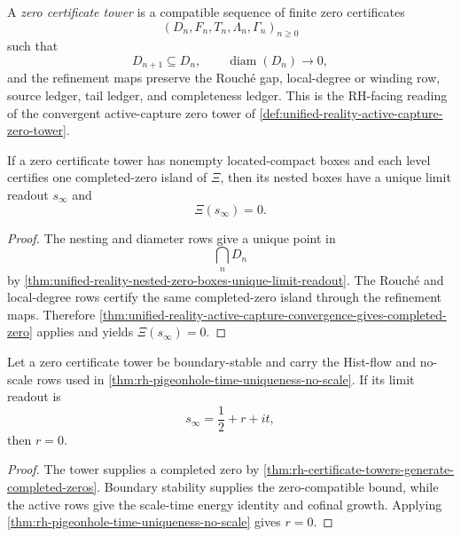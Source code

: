 \begin{definition}
\label{def:rh-zero-certificate-tower}
A \emph{zero certificate tower} is a compatible sequence of finite zero
certificates
$$
(D_n,F_n,T_n,\Lambda_n,\Gamma_n)_{n\ge0}
$$
such that
$$
D_{n+1}\subseteq D_n,
\qquad
\operatorname{diam}(D_n)\to0,
$$
and the refinement maps preserve the Rouch\'e gap, local-degree or
winding row, source ledger, tail ledger, and completeness ledger. This is
the RH-facing reading of the convergent active-capture zero tower of
\autoref{def:unified-reality-active-capture-zero-tower}.
\end{definition}

\begin{theorem}
\label{thm:rh-certificate-towers-generate-completed-zeros}
If a zero certificate tower has nonempty located-compact boxes and each
level certifies one completed-zero island of $\Xi$, then its nested boxes
have a unique limit readout $s_{\infty}$ and
$$
\Xi(s_{\infty})=0.
$$
\end{theorem}

\begin{proof}
The nesting and diameter rows give a unique point in
$$
\bigcap_nD_n
$$
by \autoref{thm:unified-reality-nested-zero-boxes-unique-limit-readout}.
The Rouch\'e and local-degree rows certify the same completed-zero island
through the refinement maps. Therefore
\autoref{thm:unified-reality-active-capture-convergence-gives-completed-zero}
applies and yields $\Xi(s_{\infty})=0$.
\end{proof}

\begin{corollary}
\label{cor:rh-legal-certificate-towers-cannot-converge-off-half}
Let a zero certificate tower be boundary-stable and carry the Hist-flow
and no-scale rows used in
\autoref{thm:rh-pigeonhole-time-uniqueness-no-scale}. If its limit readout
is
$$
s_{\infty}=\frac12+r+it,
$$
then $r=0$.
\end{corollary}

\begin{proof}
The tower supplies a completed zero by
\autoref{thm:rh-certificate-towers-generate-completed-zeros}. Boundary
stability supplies the zero-compatible bound, while the active rows give
the scale-time energy identity and cofinal growth. Applying
\autoref{thm:rh-pigeonhole-time-uniqueness-no-scale} gives $r=0$.
\end{proof}

